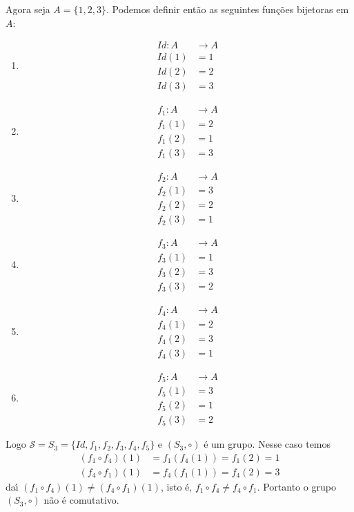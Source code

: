 Agora seja $A = \{1, 2, 3\}$. Podemos definir ent\~ao as seguintes fun\c{c}\~oes bijetoras em $A$:
\begin{multicols}{3}
	\begin{enumerate}
		\item[] \begin{align*}
			Id : A &\to A\\
			Id(1) &= 1\\
			Id(2) &= 2\\
			Id(3) &= 3
		\end{align*}
		\item[] \begin{align*}
			f_1 : A &\to A\\
			f_1(1) &= 2\\
			f_1(2) &= 1\\
			f_1(3) &= 3
		\end{align*}
		\item[] \begin{align*}
			f_2 : A &\to A\\
			f_2(1) &= 3\\
			f_2(2) &= 2\\
			f_2(3) &= 1
		\end{align*}
		\item[] \begin{align*}
			f_3 : A &\to A\\
			f_3(1) &= 1\\
			f_3(2) &= 3\\
			f_3(3) &= 2
		\end{align*}
		\item[] \begin{align*}
			f_4 : A &\to A\\
			f_4(1) &= 2\\
			f_4(2) &= 3\\
			f_4(3) &= 1
		\end{align*}
		\item[] \begin{align*}
			f_5 : A &\to A\\
			f_5(1) &= 3\\
			f_5(2) &= 1\\
			f_5(3) &= 2
		\end{align*}
	\end{enumerate}
\end{multicols}

Logo $\mathcal{S} = S_3 = \{Id, f_1, f_2, f_3, f_4, f_5\}$ e $(S_3, \circ)$ \'e um grupo. Nesse caso temos
\begin{align*}
	(f_1 \circ f_4)(1) &= f_1(f_4(1)) = f_1(2) = 1\\
	(f_4 \circ f_1)(1) &= f_4(f_1(1)) = f_4(2) = 3
\end{align*}
da{\'\i} $(f_1 \circ f_4)(1) \ne (f_4 \circ f_1)(1)$, isto \'e, $f_1 \circ f_4 \ne f_4 \circ f_1$. Portanto o grupo $(S_3, \circ)$ n\~ao \'e comutativo.

